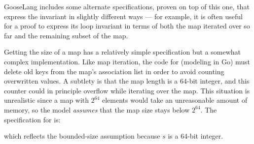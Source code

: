 GooseLang includes some alternate specifications, proven on top of this one, that
express the invariant in slightly different ways --- for example, it is often
useful for a proof to express its loop invariant in terms of both the map
iterated over so far and the remaining subset of the map.

Getting the size of a map has a relatively simple specification but a somewhat
complex implementation. Like map iteration, the code for  (modeling
 in Go) must delete old keys from the map's association list in order
to avoid counting overwritten values. A subtlety is that the map length is a
64-bit integer, and this counter could in principle overflow while iterating
over the map. This situation is unrealistic since a map with $2^{64}$ elements
would take an unreasonable amount of memory, so the model \emph{assumes} that
the map size stays below $2^{64}$. The specification for  is:
\begin{mathpar}
\end{mathpar}
which reflects the bounded-size assumption because $s$ is a 64-bit integer.
